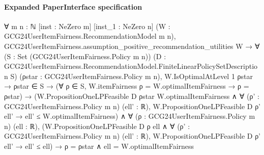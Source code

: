 \documentclass[10pt]{article}
\begin{document}
\paragraph{Expanded PaperInterface specification}
\begin{ReviewVerbatim}
∀ {m n : ℕ} [inst : NeZero m] [inst_1 : NeZero n] (W : GCG24UserItemFairness.RecommendationModel m n),
  GCG24UserItemFairness.assumption_positive_recommendation_utilities W →
    ∀ (S : Set (GCG24UserItemFairness.Policy m n))
      (D : GCG24UserItemFairness.RecommendationModel.FiniteLinearPolicySetDescription S)
      (ρstar : GCG24UserItemFairness.Policy m n),
      W.IsOptimalAtLevel 1 ρstar →
        ρstar ∈ S →
          (∀ ρ ∈ S, W.itemFairness ρ = W.optimalItemFairness → ρ = ρstar) →
            (W.PropositionOneLPFeasible D ρstar W.optimalItemFairness ∧
                ∀ (ρ' : GCG24UserItemFairness.Policy m n) (ell' : ℝ),
                  W.PropositionOneLPFeasible D ρ' ell' → ell' ≤ W.optimalItemFairness) ∧
              ∀ (ρ : GCG24UserItemFairness.Policy m n) (ell : ℝ),
                (W.PropositionOneLPFeasible D ρ ell ∧
                    ∀ (ρ' : GCG24UserItemFairness.Policy m n) (ell' : ℝ),
                      W.PropositionOneLPFeasible D ρ' ell' → ell' ≤ ell) →
                  ρ = ρstar ∧ ell = W.optimalItemFairness
\end{ReviewVerbatim}
\end{document}
